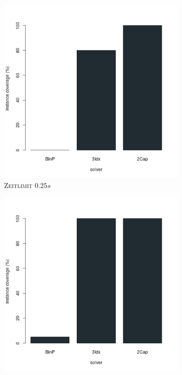 \begin{figure}[H]
\centering

\begin{subfigure}[b]{0.3\textwidth}
\centering
\includegraphics[width=1.1\textwidth]{img/solver_instance_coverage_b=2_s_0_25s.png}
\caption{\textsc{Zeitlimit $0.25s$}}
\label{fig:instance_cov_b=2_s_a}
\end{subfigure}
\hfill
\begin{subfigure}[b]{0.3\textwidth}
\centering
\includegraphics[width=1.1\textwidth]{img/solver_instance_coverage_b=2_s_0_5s.png}

\end{subfigure}
\end{figure}
